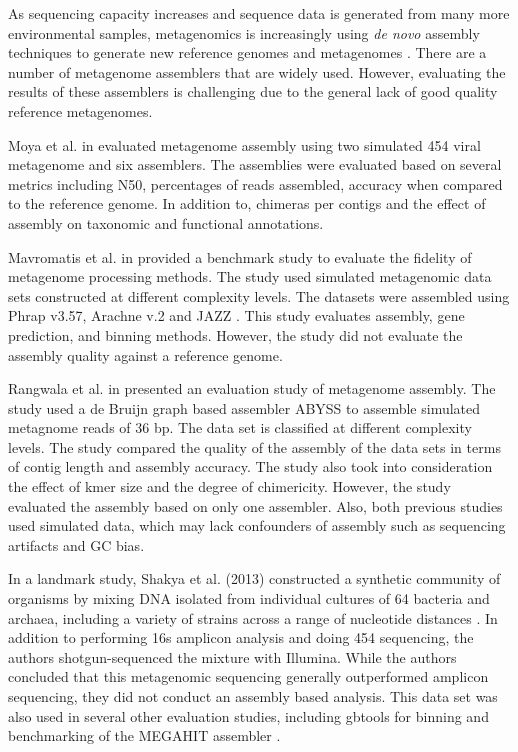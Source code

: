 \documentclass[11pt]{article}
\begin{document}
As sequencing capacity increases and sequence data is generated from
many more environmental samples, metagenomics is increasingly using
{\em de novo} assembly techniques to generate new reference genomes
and metagenomes \cite{Sharon2012}.  There are a number of metagenome
assemblers that are widely used. However, evaluating the results of
these assemblers is challenging due to the general lack of good
quality reference metagenomes.


Moya et al. in \cite{moya2014} evaluated metagenome assembly using
two simulated 454 viral metagenome and six assemblers. The assemblies
were evaluated based on several metrics including N50, percentages of
reads assembled, accuracy when compared to the reference genome. In
addition to, chimeras per contigs and the effect of assembly on
taxonomic and functional annotations.
 
Mavromatis et al. in \cite{mavromatis2007} provided a benchmark study
to evaluate the fidelity of metagenome processing methods. The study used
simulated metagenomic data sets constructed at different complexity
levels.
The datasets were assembled using Phrap v3.57, Arachne v.2
\cite{arachne} and JAZZ \cite{jazz}.
This study evaluates assembly, gene prediction, and binning
methods. However, the study did not evaluate the assembly quality
against a reference genome.

Rangwala et al. in \cite{huzefa2011} presented an evaluation study of
metagenome assembly. The study used a de Bruijn graph based assembler
ABYSS \cite{abyss} to assemble simulated metagnome reads of 36 bp. The
data set is classified at different complexity levels.  The study
compared the quality of the assembly of the data sets in terms of
contig length and assembly accuracy. The study also took into
consideration the effect of kmer size and the degree of chimericity.
However, the study evaluated the assembly based on only one
assembler. Also, both previous studies used simulated data, which may
lack confounders of assembly such as sequencing artifacts and GC bias.

In a landmark study, Shakya et al. (2013) constructed a synthetic
community of organisms by mixing DNA isolated from individual cultures
of 64 bacteria and archaea, including a variety of strains across a
range of nucleotide distances \cite{podar}.  In addition to performing
16s amplicon analysis and doing 454 sequencing, the authors
shotgun-sequenced the mixture with Illumina.  While the authors
concluded that this metagenomic sequencing generally outperformed
amplicon sequencing, they did not conduct an assembly based analysis.
This data set was also used in several other evaluation studies,
including gbtools for binning \cite{Seah2015} and benchmarking of the
MEGAHIT assembler \cite{Li2016}.
\end{document}
